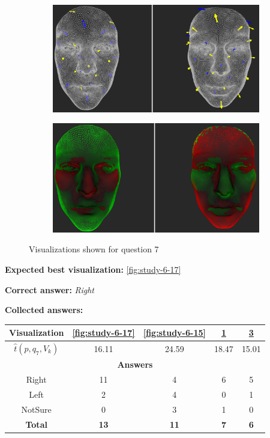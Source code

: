 \begin{figure}[h]
\begin{subfigure}{0.4\textwidth}
\includegraphics[width=\textwidth]{./screenshots/pair18.PNG}
\caption{}
\label{fig:study-6-18}
\end{subfigure}
\quad
\begin{subfigure}{0.4\textwidth}
\includegraphics[width=\textwidth]{./screenshots/pair16.PNG}
\caption{}
\label{fig:study-6-16}
\end{subfigure}
\caption{Visualizations shown for question 7}
\end{figure}
\medskip

{\bf Expected best visualization:} \ref{fig:study-6-17}
\medskip

{\bf Correct answer:} {\it Right}
\medskip

{\bf Collected answers:}

\begin{center}
\begin{tabular}{| c | c | c | c | c |}
	\hline
	Visualization & \ref{fig:study-6-17} & \ref{fig:study-6-15} & \ref{fig:study-6-18} & \ref{fig:study-6-16}\\ \hline
	\(\widehat{t}(p, q_7, V_k)\) & 16.11 & 24.59 & 18.47 & 15.01\\ \hline
	\multicolumn{5}{|c|}{\bf Answers} \\ \hline
	\rowcolor{yellow!30} Right & 11 & 4 & 6 & 5\\ \hline
	Left & 2 & 4 & 0 & 1\\ \hline
	NotSure & 0 & 3 & 1 & 0\\ \hline
	{\bf Total} & {\bf 13} & {\bf 11} & {\bf 7} & {\bf 6}\\ \hline
\end{tabular}
\end{center}
\clearpage

